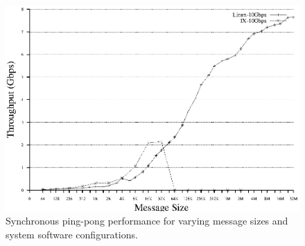 \begin{figure}
\begin{centering}
\includegraphics[width=.5\textwidth,clip]{figs/pingpong.eps}
\caption{Synchronous ping-pong performance for varying message sizes and system software configurations.}
\label{fig:pingpong}
\end{centering}
\end{figure}

